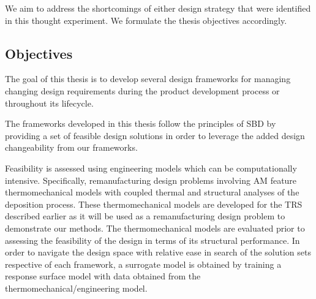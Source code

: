 We aim to address the shortcomings of either design strategy that were identified in this thought experiment. We formulate the thesis objectives accordingly.

\subsection{Objectives} \label{subsec:objectives}




The goal of this thesis is to develop several design frameworks for managing changing design requirements during the product development process or throughout its lifecycle. 

The frameworks developed in this thesis follow the principles of \acf{SBD} by providing a set of feasible design solutions in order to leverage the added design changeability from our frameworks. 

Feasibility is assessed using engineering models which can be computationally intensive. Specifically, remanufacturing design problems involving \ac{AM} feature thermomechanical models with coupled thermal and structural analyses of the deposition process. These thermomechanical models are developed for the \ac{TRS} described earlier as it will be used as a remanufacturing design problem to demonstrate our methods. The thermomechanical models are evaluated prior to assessing the feasibility of the design in terms of its structural performance. In order to navigate the design space with relative ease in search of the solution sets respective of each framework, a surrogate model is obtained by training a response surface model with data obtained from the thermomechanical/engineering model.

